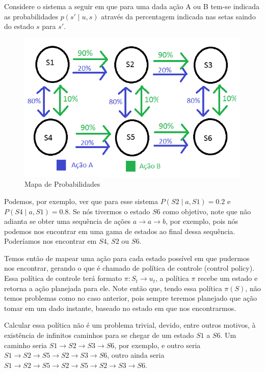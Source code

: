 Considere o sistema a seguir em que para uma dada ação A ou B tem-se indicada as probabilidades $ p \left( s' \mid u, s \right) $ através da percentagem indicada nas setas saindo do estado $ s $ para $ s' $.


\begin{figure}[h]
    \centering
    \includegraphics[width=120mm]{images/probabilidade-markov}
    \caption{\label{img:MapaDeProbabilidadesMarkov}Mapa de Probabilidades}
\end{figure}

Podemos, por exemplo, ver que para esse sistema $ P \left( S2 \mid a, S1 \right) = 0.2 $ e $ P \left( S4 \mid a, S1 \right) = 0.8 $. Se nós tivermos o estado $ S6 $ como objetivo, note que não adianta se obter uma sequência de ações $ a \rightarrow a \rightarrow b$, por exemplo, pois nós podemos nos encontrar em uma gama de estados ao final dessa sequência. Poderíamos nos encontrar em $ S4 $, $ S2 $ ou $ S6 $.

Temos então de mapear uma ação para cada estado possível em que pudermos nos encontrar, gerando o que é chamado de política de controle (control policy). Essa política de controle terá formato $ \pi: S_t \rightarrow u_t $, a política $ \pi $ recebe um estado e retorna a ação planejada para ele. Note então que, tendo essa política $ \pi \left( S \right) $, não temos problemas como no caso anterior, pois sempre teremos planejado que ação tomar em um dado instante, baseado no estado em que nos encontrarmos.

Calcular essa política não é um problema trivial, devido, entre outros motivos, à existência de infinitos caminhos para se chegar de um estado $ S1 $ a $ S6 $. Um caminho seria $ S1 \rightarrow S2 \rightarrow S3 \rightarrow S6 $, por exemplo, e outro seria $ S1 \rightarrow S2 \rightarrow S5 \rightarrow S2 \rightarrow S3 \rightarrow S6 $, outro ainda seria $ S1 \rightarrow S2 \rightarrow S5 \rightarrow S2 \rightarrow S5 \rightarrow S2 \rightarrow S3 \rightarrow S6 $.

